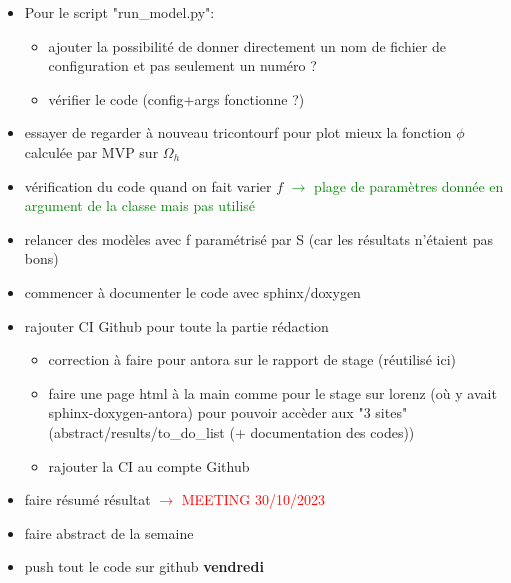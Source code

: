 \begin{itemize}[label=$\square$]
	\item Pour le script "run\_model.py":
	\begin{itemize}[label=\LARGE $\circ$]
		\item[\swontfix] ajouter la possibilité de donner directement un nom de fichier de configuration et pas seulement un numéro ?
		\item vérifier le code (config+args fonctionne ?)
	\end{itemize}
	\item essayer de regarder à nouveau tricontourf pour plot mieux la fonction $\phi$ calculée par MVP sur $\Omega_h$
	\item[\done] vérification du code quand on fait varier $f$ \textcolor{Green}{$\rightarrow$ plage de paramètres donnée en argument de la classe mais pas utilisé}
	\item[\done] relancer des modèles avec f paramétrisé par S (car les résultats n'étaient pas bons)
	\item commencer à documenter le code avec sphinx/doxygen
	\item rajouter CI Github pour toute la partie rédaction
	\begin{itemize}[label=\LARGE $\circ$]
		\item correction à faire pour antora sur le rapport de stage (réutilisé ici)
		\item faire une page html à la main comme pour le stage sur lorenz (où y avait sphinx-doxygen-antora) pour pouvoir accèder aux "3 sites" (abstract/results/to\_do\_list (+ documentation des codes))
		\item rajouter la CI au compte Github
	\end{itemize}
	\item[\done] faire résumé résultat \textcolor{red}{$\rightarrow$ MEETING 30/10/2023} 
	\item[\done] faire abstract de la semaine 
	\item[\done] push tout le code sur github \textbf{vendredi}
\end{itemize}